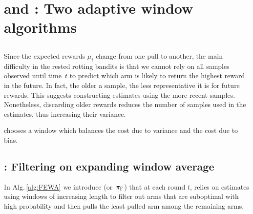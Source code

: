 
\section{{\FEWA} and {\RAW} : Two adaptive window algorithms}

\subsection{}
Since the expected rewards $\mu_i$ change from one pull to another, the main difficulty in the rested rotting bandits is that we cannot rely on all samples observed until time~$t$ to predict which arm is likely to return the highest reward in the future. In fact, the older a sample, the less representative it is for future rewards. This suggests constructing estimates using the more recent samples. Nonetheless, discarding older rewards reduces the number of samples used in the estimates, thus increasing their variance. 

\SWA chooses a window which balances the cost due to variance and the cost due to bias. %



\subsection{{\FEWA}: Filtering on expanding window average}%

 In Alg.\,\ref{alg:FEWA} we introduce \FEWA (or~$\pi_{\rm F}$) that at each round $t$, relies on estimates using windows of increasing length to filter out arms that are suboptimal with high probability and then pulls the least pulled arm among the remaining arms. 
 

